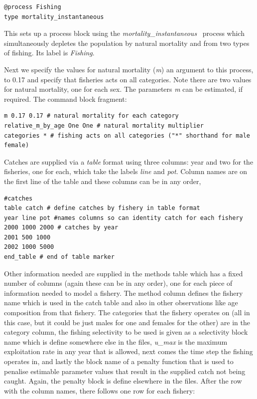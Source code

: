 {\small{\begin{verbatim}
@process Fishing
type mortality_instantaneous
\end{verbatim}}}

This sets up a process block using the \textit{mortality\_instantaneous}~ process which simultaneously depletes the population by natural mortality and from two types of fishing. Its label is \textit{Fishing}.

Next we specify the values for natural mortality (\textit{m}) an argument to this process, to 0.17 and specify that fisheries acts on all categories. Note there are two values for natural mortality, one for each sex. The parameters \textit{m} can be estimated, if required. The command block fragment:

{\small{\begin{verbatim}
m 0.17 0.17 # natural mortality for each category
relative_m_by_age One One # natural mortality multiplier
categories * # fishing acts on all categories ("*" shorthand for male female)
\end{verbatim}}}

Catches are supplied via a \textit{table} format using three columns: year and two for the fisheries, one for each, which take the labels \textit{line} and \textit{pot}. Column names are on the first line of the table and these columns can be in any order,

{\small{\begin{verbatim}
#catches
table catch # define catches by fishery in table format
year line pot #names columns so can identity catch for each fishery
2000 1000 2000 # catches by year
2001 500 1000
2002 1000 5000
end_table # end of table marker
\end{verbatim}}}

Other information needed are supplied in the methods table which has a fixed number of columns (again these can be in any order), one for each piece of information needed to model a fishery. The method column defines the fishery name which is used in the catch table and also in other observations like age composition from that fishery. The categories that the fishery operates on (all in this case, but it could be just males for one and females for the other) are in the category column, the fishing selectivity to be used is given as a selectivity block name which is define somewhere else in the files, \textit{u\_max} is the maximum exploitation rate in any year that is allowed, next comes the time step the fishing operates in, and lastly the block name of a penalty function that is used to penalise estimable parameter values that result in the supplied catch not being caught. Again, the penalty block is define elsewhere in the files. After the row with the column names, there follows one row for each fishery:

